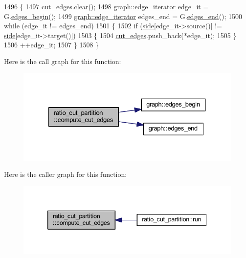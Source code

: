 \begin{DoxyCode}
1496 \{
1497     \mbox{\hyperlink{classratio__cut__partition_a5ab55eef04a72c0be731d848cb9a5d50}{cut\_edges}}.clear();
1498     \mbox{\hyperlink{classgraph_a818d3766018eb0af91d520ce2150203c}{graph::edge\_iterator}} edge\_it = G.\mbox{\hyperlink{classgraph_a7ba35a4c4e8343ffb27ed6d9703c6f18}{edges\_begin}}();
1499     \mbox{\hyperlink{classgraph_a818d3766018eb0af91d520ce2150203c}{graph::edge\_iterator}} edges\_end = G.\mbox{\hyperlink{classgraph_aea8d7f976b85b6137f52d915e26639f6}{edges\_end}}();
1500     \textcolor{keywordflow}{while} (edge\_it != edges\_end)
1501     \{
1502     \textcolor{keywordflow}{if} (\mbox{\hyperlink{classratio__cut__partition_a2bf913d1d8607747885177a3b585e611}{side}}[edge\_it->source()] != \mbox{\hyperlink{classratio__cut__partition_a2bf913d1d8607747885177a3b585e611}{side}}[edge\_it->target()])
1503     \{
1504         \mbox{\hyperlink{classratio__cut__partition_a5ab55eef04a72c0be731d848cb9a5d50}{cut\_edges}}.push\_back(*edge\_it);
1505     \}
1506     ++edge\_it;
1507     \}
1508 \}
\end{DoxyCode}
Here is the call graph for this function\+:\nopagebreak
\begin{figure}[H]
\begin{center}
\leavevmode
\includegraphics[width=327pt]{classratio__cut__partition_a5588508593940888323121b340b40477_cgraph}
\end{center}
\end{figure}
Here is the caller graph for this function\+:\nopagebreak
\begin{figure}[H]
\begin{center}
\leavevmode
\includegraphics[width=339pt]{classratio__cut__partition_a5588508593940888323121b340b40477_icgraph}
\end{center}
\end{figure}
\mbox{\label{classratio__cut__partition_a11bd0644238997c99e7035507c709e50}} 

